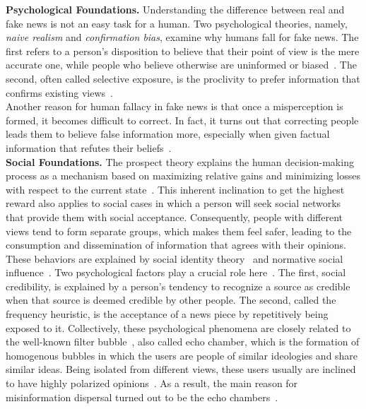 \textbf{Psychological Foundations.}  Understanding the difference between real and fake news is not an easy task
for a human. Two psychological theories, namely, \emph{naive realism} and \emph{confirmation bias}, examine why humans fall for fake news. The first refers to a person's disposition to believe that their point of view is the
mere accurate one, while people who believe otherwise are uninformed or biased~\parencite{NaiveRealism_Reed}.
The second, often called selective exposure, is the proclivity to prefer information that confirms existing views~\parencite{ConfirmationBias_Nickerson}.\\
Another reason for human fallacy in fake news is that once a misperception is formed, it becomes difficult to correct. In fact, it turns out that correcting people leads them to believe false information more, especially
when given factual information that refutes their beliefs~\parencite{WhenCorrectionsFail_Nyhan}.\\

\textbf{Social Foundations.}  The prospect theory explains the human decision-making process as a mechanism based
on maximizing relative gains and minimizing losses with respect to the current state~\parencite{ProspectTheory_Kahneman, AdvancesInProspectTheory_Kahneman}. This inherent inclination to get the highest reward also applies to social cases in which a person will seek social networks that provide them with social acceptance. Consequently,  people with different views tend to form separate groups, which makes them feel safer, leading to
the consumption and dissemination of information that agrees with their opinions. These behaviors are explained by social identity theory~\parencite{SocialIdentityTheory_Ashforth} and normative social influence~\parencite{NormativeSocialInfluence_Asch}.
Two psychological factors play a crucial role here~\parencite{TheRussianFirehoseOfFalsehood_Paul}. The first, social credibility, is explained by a person’s tendency to recognize a source as credible when that source is deemed credible by other people. The second, called the frequency heuristic, is the acceptance of a news piece by repetitively being exposed to it. Collectively, these psychological phenomena are closely related to the well-known filter bubble~\parencite{TheFilterBubble_Pariser}, also called echo chamber, which is the formation of homogenous bubbles in which the users are people of similar ideologies and share similar ideas. Being isolated from different views, these users usually are inclined to have highly polarized opinions~\parencite{EchoChambers_Sunstein}. As a result, the main reason for misinformation dispersal turned out to be the echo
chambers~\parencite{TheSpreadingOfMisinformationOnline_DelVicario}.\\

